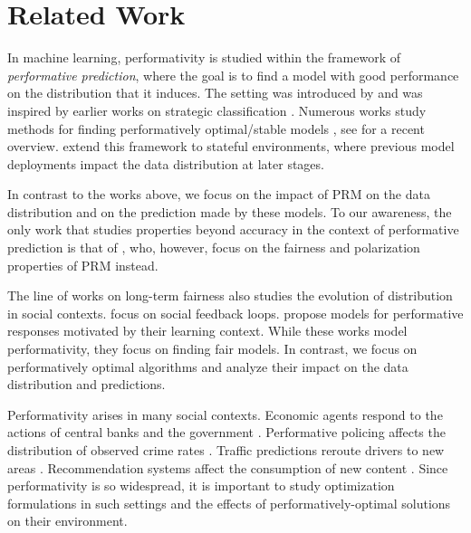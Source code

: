 \section{Related Work}


 In machine learning, performativity is studied within the framework of
\emph{performative prediction}, where the goal is to find a model with good
performance on the distribution that it induces. The setting was introduced by
\citet{p20p} and was inspired by earlier works on strategic classification
\citep{h16s,d04a}. Numerous works study methods for finding performatively
optimal/stable models \citep{mendler2020stochastic,%
izzo2022learn,ray2022decision, %
lin2024plugin}, see \citet{hardt2023performative} for a recent overview.
\citet{b22p,r22d} extend this framework to stateful
environments, where previous model deployments impact the data distribution at
later stages.

In contrast to the works above, we focus on the impact of PRM on the data distribution and on the prediction made by these models. To our awareness, the only work that studies properties beyond accuracy in the context of performative prediction is that of \citet{jin2024addressing}, who, however, focus on the
fairness and polarization properties of PRM instead.

 The line of works on long-term fairness also studies the evolution of
distribution in social contexts. \citet{ensign2018runaway,bechavod2019equal}
focus on social feedback loops. \citet{williams2019dynamic, liu2020disparate}
propose models for performative responses motivated by their learning context.
While these works model performativity, they focus on finding fair models. In
contrast, we focus on performatively optimal algorithms and analyze their
impact on the data distribution and predictions. 

 Performativity arises in many social contexts. Economic agents respond to the
actions of central banks and the government \citep{l76e}. Performative policing
affects the distribution of observed crime rates \citep{e18r}. Traffic
predictions reroute drivers to new areas \citep{m19w,c22i}. Recommendation
systems affect the consumption of new content \citep{b22d,d22p}. Since performativity is so widespread, it is important to study optimization formulations in such settings and the effects of performatively-optimal solutions on their environment.
